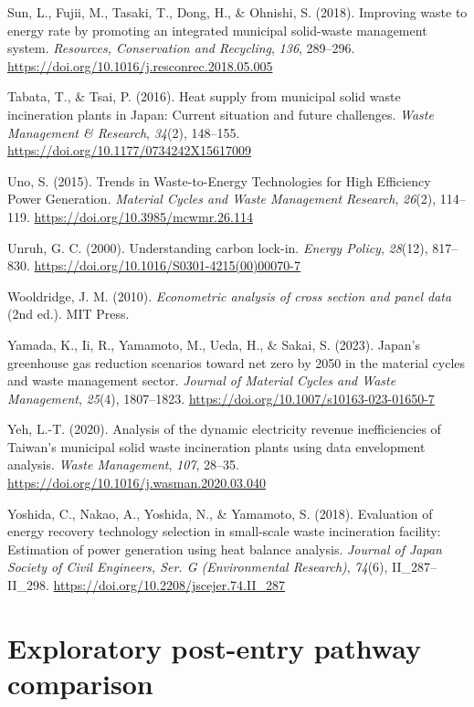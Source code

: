 \documentclass[12pt,a4paper]{article}
\begin{document}
Sun, L., Fujii, M., Tasaki, T., Dong, H., \& Ohnishi, S. (2018). Improving
waste to energy rate by promoting an integrated municipal solid-waste
management system. \textit{Resources, Conservation and Recycling},
\textit{136}, 289--296.
\url{https://doi.org/10.1016/j.resconrec.2018.05.005}

Tabata, T., \& Tsai, P. (2016). Heat supply from municipal solid waste
incineration plants in Japan: Current situation and future challenges.
\textit{Waste Management \& Research}, \textit{34}(2), 148--155.
\url{https://doi.org/10.1177/0734242X15617009}

Uno, S. (2015). Trends in Waste-to-Energy Technologies for High Efficiency
Power Generation. \textit{Material Cycles and Waste Management Research},
\textit{26}(2), 114--119. \url{https://doi.org/10.3985/mcwmr.26.114}

Unruh, G. C. (2000). Understanding carbon lock-in. \textit{Energy Policy},
\textit{28}(12), 817--830.
\url{https://doi.org/10.1016/S0301-4215(00)00070-7}

Wooldridge, J. M. (2010). \textit{Econometric analysis of cross section and
panel data} (2nd ed.). MIT Press.

Yamada, K., Ii, R., Yamamoto, M., Ueda, H., \& Sakai, S. (2023). Japan's
greenhouse gas reduction scenarios toward net zero by 2050 in the material
cycles and waste management sector. \textit{Journal of Material Cycles and
Waste Management}, \textit{25}(4), 1807--1823.
\url{https://doi.org/10.1007/s10163-023-01650-7}

Yeh, L.-T. (2020). Analysis of the dynamic electricity revenue inefficiencies
of Taiwan's municipal solid waste incineration plants using data envelopment
analysis. \textit{Waste Management}, \textit{107}, 28--35.
\url{https://doi.org/10.1016/j.wasman.2020.03.040}

Yoshida, C., Nakao, A., Yoshida, N., \& Yamamoto, S. (2018). Evaluation of
energy recovery technology selection in small-scale waste incineration
facility: Estimation of power generation using heat balance analysis.
\textit{Journal of Japan Society of Civil Engineers, Ser. G (Environmental
Research)}, \textit{74}(6), II\_287--II\_298.
\url{https://doi.org/10.2208/jscejer.74.II_287}

\endgroup

\clearpage
\appendix
{}

\section{Exploratory post-entry pathway comparison}
\end{document}
